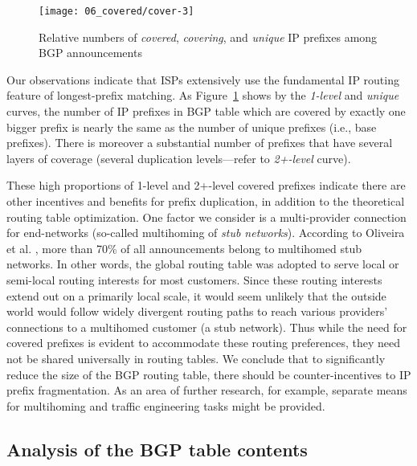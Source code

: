 \begin{figure}[htbp]
	\centering
		\texttt{[image: 06\_covered/cover-3]}
	\caption{Relative numbers of \emph{covered}, \emph{covering}, and \emph{unique} IP prefixes among BGP announcements}
	\label{fig:covered}
\end{figure}

Our observations indicate that ISPs extensively use the fundamental IP routing
feature of longest-prefix matching. As Figure~\ref{fig:covered} shows by the
\emph{1-level} and \emph{unique} curves, the number of IP prefixes in BGP table
which are covered by exactly one bigger prefix is nearly the same as the number
of unique prefixes (i.e., base prefixes). There is moreover a substantial
number of prefixes that have several layers of coverage (several duplication
levels---refer to \emph{2+-level} curve).

These high proportions of 1-level and 2+-level covered prefixes indicate there
are other incentives and benefits for prefix duplication, in addition to the
theoretical routing table optimization. One factor we consider is a
multi-provider connection for end-networks (so-called multihoming of \emph{stub
networks}). According to Oliveira et al.
\cite{Oliveira:2007:Observing-the-evolution}, more than 70\% of all
announcements belong to multihomed stub networks. In other words, the global
routing table was adopted to serve local or semi-local routing interests for
most customers. Since these routing interests extend out on a primarily local
scale, it would seem unlikely that the outside world would follow widely
divergent routing paths to reach various providers' connections to a multihomed
customer (a stub network). Thus while the need for covered prefixes is evident
to accommodate these routing preferences, they need not be shared universally
in routing tables. We conclude that to significantly reduce the size of the BGP
routing table, there should be counter-incentives to IP prefix fragmentation.
As an area of further research, for example, separate means for multihoming and
traffic engineering tasks might be provided.

\subsection{Analysis of the BGP table contents}

